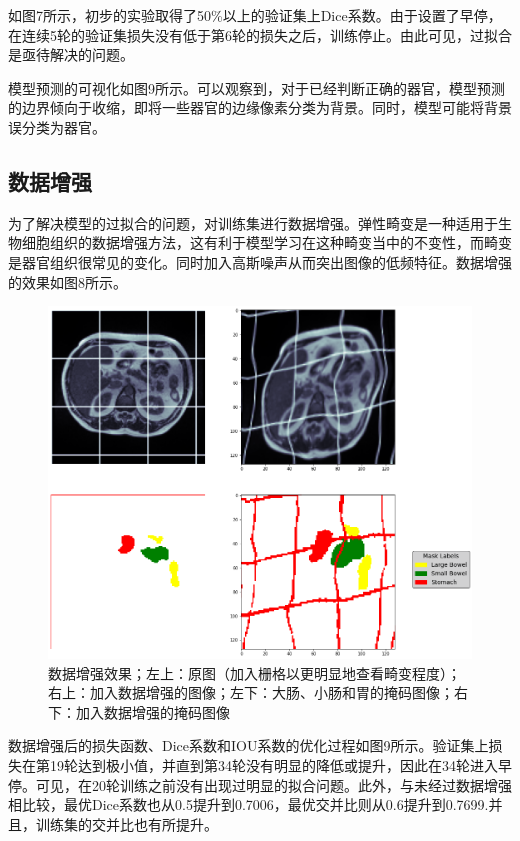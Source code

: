 \documentclass[letterpaper, 10pt, conference, twoside]{ieeeconf}
\begin{document}
如图7所示，初步的实验取得了50\%以上的验证集上Dice系数。由于设置了早停，在连续5轮的验证集损失没有低于第6轮的损失之后，训练停止。由此可见，过拟合是亟待解决的问题。

模型预测的可视化如图9所示。可以观察到，对于已经判断正确的器官，模型预测的边界倾向于收缩，即将一些器官的边缘像素分类为背景。同时，模型可能将背景误分类为器官。

\subsection{数据增强}

为了解决模型的过拟合的问题，对训练集进行数据增强。弹性畸变\cite{c5}是一种适用于生物细胞组织的数据增强方法，这有利于模型学习在这种畸变当中的不变性，而畸变是器官组织很常见的变化。同时加入高斯噪声从而突出图像的低频特征。数据增强的效果如图8所示。

\begin{figure}[htbp]
  \centering
  \includegraphics[width = 1\linewidth]{elastic3.png}
  \caption{数据增强效果；左上：原图（加入栅格以更明显地查看畸变程度）；右上：加入数据增强的图像；左下：大肠、小肠和胃的掩码图像；右下：加入数据增强的掩码图像}
  \label{fig:fig8}
\end{figure}

数据增强后的损失函数、Dice系数和IOU系数的优化过程如图9所示。验证集上损失在第19轮达到极小值，并直到第34轮没有明显的降低或提升，因此在34轮进入早停。可见，在20轮训练之前没有出现过明显的拟合问题。此外，与未经过数据增强相比较，最优Dice系数也从0.5提升到0.7006，最优交并比则从0.6提升到0.7699.并且，训练集的交并比也有所提升。
\end{document}
